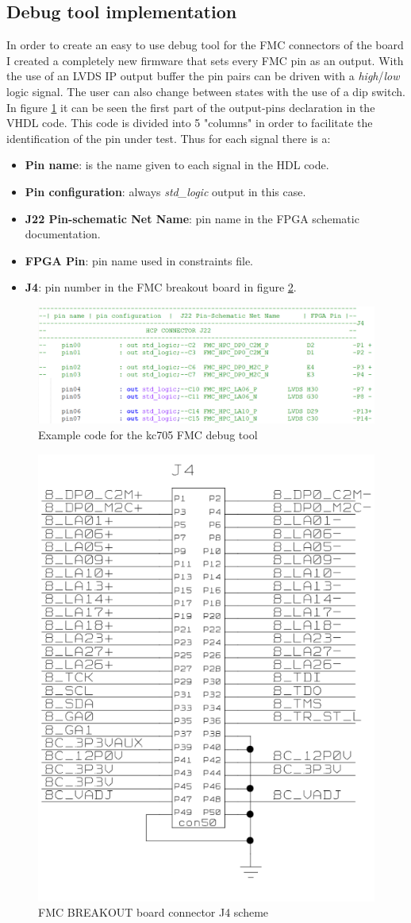 \subsection{Debug tool implementation}
In order to create an easy to use debug tool for the FMC connectors of the board I created a completely new firmware that sets every FMC pin as an output.
With the use of an LVDS IP output buffer the pin pairs can be driven with a \textit{high}/\textit{low} logic signal.
The user can also change between states with the use of a dip switch.
In figure \ref{fig:debug1} it can be seen the first part of the output-pins declaration in the VHDL code.
This code is divided into 5 "columns" in order to facilitate the identification of the pin under test.
Thus for each signal there is a:
\begin{itemize}
	\item \textbf{Pin name}: is the name given to each signal in the HDL code.
	\item \textbf{Pin configuration}: always \textit{std\_logic} output in this case.
	\item \textbf{J22 Pin-schematic Net Name}: pin name in the FPGA schematic documentation. 
	\item \textbf{FPGA Pin}: pin name used in constraints file. 
	\item \textbf{J4}: pin number in the FMC breakout board in figure \ref{fig:debug2}. 
\end{itemize}     
\begin{figure}[H]
	\centering
	\includegraphics[width=0.8\linewidth]{IMG/ch3/DEBUG1}
	\caption{Example code for the kc705 FMC debug tool}
	\label{fig:debug1}
\end{figure}
\begin{figure}[H]
	\centering
	\includegraphics[width=0.35\linewidth]{IMG/ch3/DEBUG2}
	\caption{FMC BREAKOUT board connector J4 scheme}
	\label{fig:debug2}
\end{figure}
